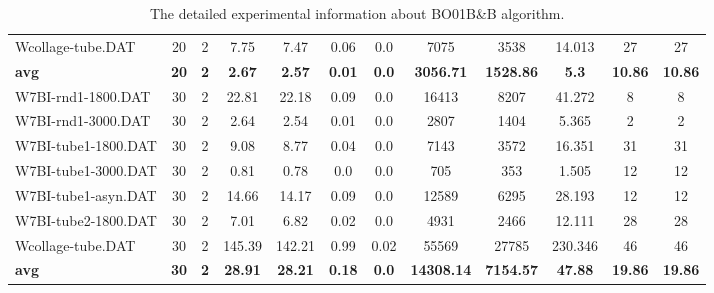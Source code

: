 \begin{table}[!h]
{\begin{tabular}{lccccccccccc}
Wcollage-tube.DAT & 20 & 2 & 7.75 & 7.47 & 0.06 & 0.0 & 7075 & 3538 & 14.013 & 27 & 27\\
\cline{1-12} \textbf{avg} & \textbf{20} & \textbf{2} & \textbf{2.67} & \textbf{2.57} & \textbf{0.01} & \textbf{0.0} & \textbf{3056.71} & \textbf{1528.86} & \textbf{5.3} & \textbf{10.86} & \textbf{10.86} \\ \cline{1-12}
W7BI-rnd1-1800.DAT & 30 & 2 & 22.81 & 22.18 & 0.09 & 0.0 & 16413 & 8207 & 41.272 & 8 & 8\\
W7BI-rnd1-3000.DAT & 30 & 2 & 2.64 & 2.54 & 0.01 & 0.0 & 2807 & 1404 & 5.365 & 2 & 2\\
W7BI-tube1-1800.DAT & 30 & 2 & 9.08 & 8.77 & 0.04 & 0.0 & 7143 & 3572 & 16.351 & 31 & 31\\
W7BI-tube1-3000.DAT & 30 & 2 & 0.81 & 0.78 & 0.0 & 0.0 & 705 & 353 & 1.505 & 12 & 12\\
W7BI-tube1-asyn.DAT & 30 & 2 & 14.66 & 14.17 & 0.09 & 0.0 & 12589 & 6295 & 28.193 & 12 & 12\\
W7BI-tube2-1800.DAT & 30 & 2 & 7.01 & 6.82 & 0.02 & 0.0 & 4931 & 2466 & 12.111 & 28 & 28\\
Wcollage-tube.DAT & 30 & 2 & 145.39 & 142.21 & 0.99 & 0.02 & 55569 & 27785 & 230.346 & 46 & 46\\
\cline{1-12} \textbf{avg} & \textbf{30} & \textbf{2} & \textbf{28.91} & \textbf{28.21} & \textbf{0.18} & \textbf{0.0} & \textbf{14308.14} & \textbf{7154.57} & \textbf{47.88} & \textbf{19.86} & \textbf{19.86} \\ \cline{1-12}
\bottomrule
\end{tabular}%
}%
\caption{The detailed experimental information about BO01B\&B algorithm.}
\label{tab:table_bb}
\end{table}

